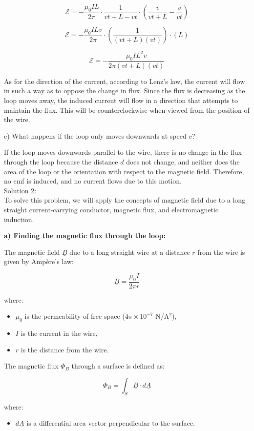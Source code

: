 \documentclass[a4paper,11pt]{article}
\begin{document}
\[
\mathcal{E} = -\frac{\mu_0 I L}{2 \pi} \cdot \frac{1}{vt+L - vt} \cdot \left(\frac{v}{vt+L} - \frac{v}{vt}\right)
\]

\[
\mathcal{E} = -\frac{\mu_0 I L v}{2 \pi} \cdot \left(\frac{1}{(vt+L)(vt)}\right) \cdot (L)
\]

\[
\mathcal{E} = -\frac{\mu_0 I L^2 v}{2 \pi (vt+L)(vt)}
\]

As for the direction of the current, according to Lenz's law, the current will flow in such a way as to oppose the change in flux. Since the flux is decreasing as the loop moves away, the induced current will flow in a direction that attempts to maintain the flux. This will be counterclockwise when viewed from the position of the wire.

c) What happens if the loop only moves downwards at speed \( v \)?

If the loop moves downwards parallel to the wire, there is no change in the flux through the loop because the distance \( d \) does not change, and neither does the area of the loop or the orientation with respect to the magnetic field. Therefore, no emf is induced, and no current flows due to this motion. \\

Solution 2: \\

To solve this problem, we will apply the concepts of magnetic field due to a long straight current-carrying conductor, magnetic flux, and electromagnetic induction.

\textbf{a) Finding the magnetic flux through the loop:}

The magnetic field $\underline{B}$ due to a long straight wire at a distance $r$ from the wire is given by Ampère's law:

\[
\underline{B} = \frac{\mu_0 I}{2\pi r}
\]

where:
\begin{itemize}
    \item $\mu_0$ is the permeability of free space ($4\pi \times 10^{-7}$ N/A$^2$),
    \item $I$ is the current in the wire,
    \item $r$ is the distance from the wire.
\end{itemize}

The magnetic flux $\Phi_B$ through a surface is defined as:

\[
\Phi_B = \int_S \underline{B} \cdot d\underline{A}
\]

where:
\begin{itemize}
    \item $d\underline{A}$ is a differential area vector perpendicular to the surface.
\end{itemize}
\end{document}
